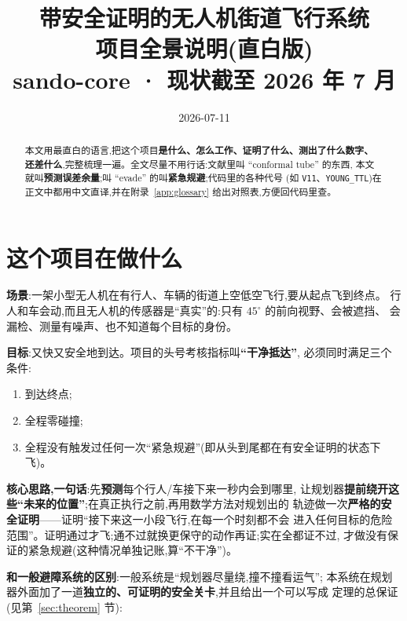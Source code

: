 \documentclass[11pt]{ctexart}
\title{\textbf{带安全证明的无人机街道飞行系统}\\[4pt]
\large 项目全景说明(直白版)\\
\normalsize sando-core \; · \; 现状截至 2026 年 7 月}
\author{}
\date{2026-07-11}
\newcommand{\code}[1]{\texttt{#1}}
\begin{document}
\maketitle

\begin{abstract}
本文用最直白的语言,把这个项目\textbf{是什么、怎么工作、证明了什么、测出了什么数字、
还差什么},完整梳理一遍。全文尽量不用行话:文献里叫 ``conformal tube'' 的东西,
本文就叫\textbf{预测误差余量};叫 ``evade'' 的叫\textbf{紧急规避};代码里的各种代号
(如 \code{V11}、\code{YOUNG\_TTL})在正文中都用中文直译,并在附录~\ref{app:glossary}
给出对照表,方便回代码里查。
\end{abstract}

\tableofcontents
\newpage

\section{这个项目在做什么}

\textbf{场景}:一架小型无人机在有行人、车辆的街道上空低空飞行,要从起点飞到终点。
行人和车会动,而且无人机的传感器是``真实''的:只有 $45^\circ$ 的前向视野、会被遮挡、
会漏检、测量有噪声、也不知道每个目标的身份。

\textbf{目标}:又快又安全地到达。项目的头号考核指标叫\textbf{``干净抵达''},
必须同时满足三个条件:
\begin{enumerate}
  \item 到达终点;
  \item 全程零碰撞;
  \item 全程没有触发过任何一次``紧急规避''(即从头到尾都在有安全证明的状态下飞)。
\end{enumerate}

\textbf{核心思路,一句话}:先\textbf{预测}每个行人/车接下来一秒内会到哪里,
让规划器\textbf{提前绕开这些``未来的位置''};在真正执行之前,再用数学方法对规划出的
轨迹做一次\textbf{严格的安全证明}——证明``接下来这一小段飞行,在每一个时刻都不会
进入任何目标的危险范围''。证明通过才飞;通不过就换更保守的动作再证;实在全都证不过,
才做没有保证的紧急规避(这种情况单独记账,算``不干净'')。

\textbf{和一般避障系统的区别}:一般系统是``规划器尽量绕,撞不撞看运气'';
本系统在规划器外面加了一道\textbf{独立的、可证明的安全关卡},并且给出一个可以写成
定理的总保证(见第~\ref{sec:theorem} 节):
\begin{center}
\end{center}
\end{document}
